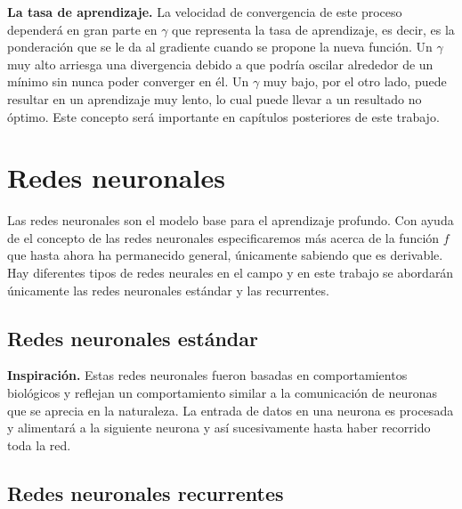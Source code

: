 \textbf{La tasa de aprendizaje.} La velocidad de convergencia de este proceso dependerá en gran parte en $\gamma$ que representa la tasa de aprendizaje, es decir, es la ponderación que se le da al gradiente cuando se propone la nueva función. Un $\gamma$ muy alto arriesga una divergencia debido a que podría oscilar alrededor de un mínimo sin nunca poder converger en él. Un $\gamma$ muy bajo, por el otro lado, puede resultar en un aprendizaje muy lento, lo cual puede llevar a un resultado no óptimo. Este concepto será importante en capítulos posteriores de este trabajo.

\section{Redes neuronales}

Las redes neuronales son el modelo base para el aprendizaje profundo. Con ayuda de el concepto de las redes neuronales especificaremos más acerca de la función $f$ que hasta ahora ha permanecido general, únicamente sabiendo que es derivable. Hay diferentes tipos de redes neurales en el campo y en este trabajo se abordarán únicamente las redes neuronales estándar y las recurrentes.

\subsection{Redes neuronales estándar}

\textbf{Inspiración.} Estas redes neuronales fueron basadas en comportamientos biológicos y reflejan un comportamiento similar a la comunicación de neuronas que se aprecia en la naturaleza. La entrada de datos en una neurona es procesada y alimentará a la siguiente neurona y así sucesivamente hasta haber recorrido toda la red.

\subsection{Redes neuronales recurrentes}